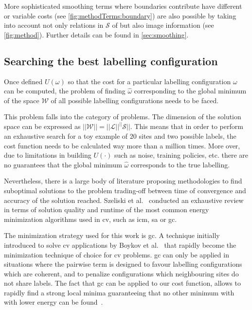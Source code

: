 More sophisticated smoothing terms where boundaries contribute have different or variable costs (see \cref{fig:methodTerms:boundary}) are also possible by taking into account not only relations in $\mathcal{S}$ of but also image information (see \cref{fig:method}). 
Further details can be found in \cref{sec:smoothing}.

\subsection{Searching the best labelling configuration}
Once defined $U(\omega)$ so that the cost for a particular labelling configuration $\omega$ can be computed, the problem of finding $\hat{\omega}$ corresponding to the global minimum of the space $\mathcal{W}$ of all possible labelling configurations needs to be faced. 

This problem falls into the category of  problems. 
The dimension of the solution space can be expressed as $||\mathcal{W}|| = ||\mathcal{L}||^||\mathcal{S}||$. 
This means that in order to perform an exhaustive search for a toy example of $20$ sites and two possible labels, the cost function needs to be calculated way more than a million times. 
More over, due to limitations in building $U(\cdot)$ such as noise, training policies, etc. there are no guarantees that the global minimum $\hat{\omega}$ corresponds to the true labelling.

Nevertheless, there is a large body of literature proposing methodologies to find suboptimal solutions to the problem trading-off between time of convergence and accuracy of the solution reached.
Szeliski et al.~\cite{szeliski2008comparative} conducted an exhaustive review in terms of solution quality and runtime of the most common energy minimization algorithms used in \ac{cv}, such as \ac{icm}, \ac{sa} or \ac{gc}.

The minimization strategy used for this work is \ac{gc}. 
A technique initially introduced to solve \ac{cv} applications by Boykov et al.~\cite{boykov2001fast} that rapidly become the minimization technique of choice for \ac{cv} problems.
\ac{gc} can only be applied in situations where the pairwise term is designed to favour labelling configurations which are coherent, and to penalize configurations which neighbouring sites do not share labels.
The fact that \ac{gc} can be applied to our cost function, allows to rapidly find a strong local minima guaranteeing that no other minimum with with lower energy can be found~\cite{delong2012fast}. 

